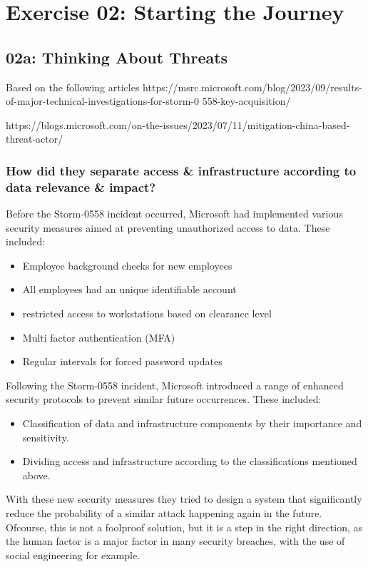 \section{Exercise 02: Starting the Journey}

\subsection{02a: Thinking About Threats}

Based on the following articles
https://msrc.microsoft.com/blog/2023/09/results-of-major-technical-investigations-for-storm-0
558-key-acquisition/

https://blogs.microsoft.com/on-the-issues/2023/07/11/mitigation-china-based-threat-actor/


\subsubsection{How did they separate access \& infrastructure according to data relevance \& impact?}
Before the Storm-0558 incident occurred, Microsoft had implemented various security measures aimed at
preventing unauthorized access to data. These included:
\begin{itemize}
    \item Employee background checks for new employees
    \item All employees had an unique identifiable account
    \item restricted access to workstations based on clearance level
    \item Multi factor authentication (MFA)
    \item Regular intervals for forced password updates
\end{itemize}

Following the Storm-0558 incident, Microsoft introduced a range of enhanced security protocols to prevent similar future occurrences. These included:
\begin{itemize}
    \item Classification of data and infrastructure components by their importance and sensitivity.
    \item Dividing access and infrastructure according to the classifications mentioned above.
\end{itemize}
With these new security measures they tried to design a system that significantly reduce the probability of a similar attack happening again in the future.
Ofcourse, this is not a foolproof solution, but it is a step in the right direction, as the human factor is a major factor in many security breaches,
with the use of social engineering for example.


